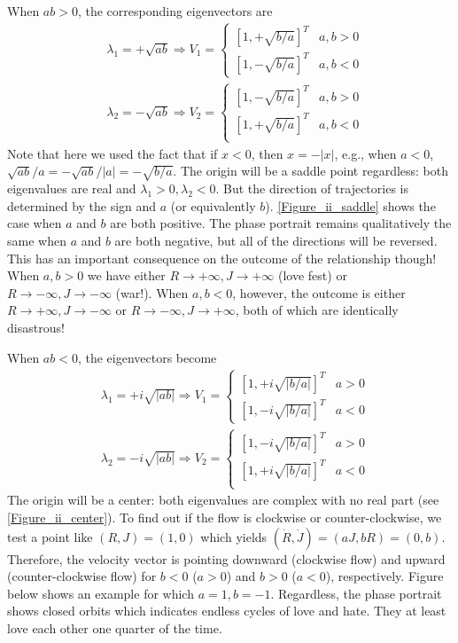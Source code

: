 \documentclass[12pt]{article}
\begin{document}
\begin{ex}
\begin{solution}
\begin{enumerate}[(i)]
  When $ab>0$, the corresponding eigenvectors are
  \begin{align*}
    &\lambda_1=+\sqrt{ab}\Rightarrow V_1=
    \begin{cases}
      \left[1,+\sqrt{b/a}\right]^T & a,b>0\\
      \left[1,-\sqrt{b/a}\right]^T & a,b<0
    \end{cases}\\
    &\lambda_2=-\sqrt{ab}\Rightarrow V_2=
    \begin{cases}
      \left[1,-\sqrt{b/a}\right]^T & a,b>0\\
      \left[1,+\sqrt{b/a}\right]^T & a,b<0\\
    \end{cases}
  \end{align*}
  Note that here we used the fact that if $x<0$, then $x=-|x|$, e.g., when $a<0$, $\sqrt{ab}/a=-\sqrt{ab}/|a|=-\sqrt{b/a}$. The origin will be a saddle point regardless: both eigenvalues are real and $\lambda_1>0,\lambda_2<0$. But the direction of trajectories is determined by the sign and $a$ (or equivalently $b$). \autoref{Figure_ii_saddle} shows the case when $a$ and $b$ are both positive. The phase portrait remains qualitatively the same when $a$ and $b$ are both negative, but all of the directions will be reversed. This has an important consequence on the outcome of the relationship though! When $a,b>0$ we have either $R\to+\infty,J\to+\infty$ (love fest) or $R\to-\infty,J\to-\infty$ (war!). When $a,b<0$, however, the outcome is either $R\to+\infty,J\to-\infty$ or $R\to-\infty,J\to+\infty$, both of which are identically disastrous!

  When $ab<0$, the eigenvectors become
  \begin{align*}
    &\lambda_1=+i\sqrt{\lvert ab\rvert}\Rightarrow V_1=
    \begin{cases}
      \left[1,+i\sqrt{\lvert b/a\rvert}\right]^T & a>0\\
      \left[1,-i\sqrt{\vert b/a\rvert}\right]^T & a<0
    \end{cases}\\
    &\lambda_2=-i\sqrt{\lvert ab\rvert}\Rightarrow V_2=
    \begin{cases}
      \left[1,-i\sqrt{\lvert b/a\rvert}\right]^T & a>0\\
      \left[1,+i\sqrt{\lvert b/a\rvert}\right]^T & a<0\\
    \end{cases}
  \end{align*}
  The origin will be a center: both eigenvalues are complex with no real part (see \autoref{Figure_ii_center}). To find out if the flow is clockwise or counter-clockwise, we test a point like $(R,J)=(1,0)$ which yields $(\dot{R},\dot{J})=(aJ,bR)=(0,b)$. Therefore, the velocity vector is pointing downward (clockwise flow) and upward (counter-clockwise flow) for $b<0$ ($a>0$) and $b>0$ ($a<0$), respectively. Figure below shows an example for which $a=1,b=-1$. Regardless, the phase portrait shows closed orbits which indicates endless cycles of love and hate. They at least love each other one quarter of the time.


\end{enumerate}
\end{solution}
\end{ex}
\end{document}
